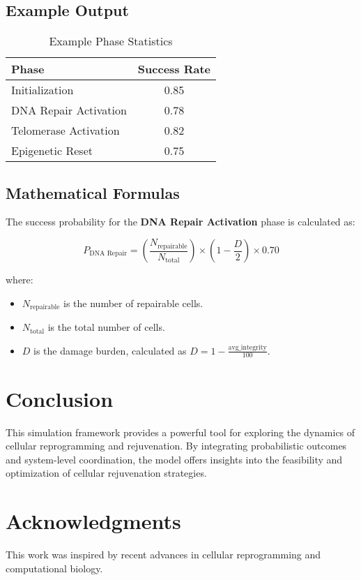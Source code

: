 \documentclass{article}
\begin{document}
\subsection{Example Output}
\begin{table}[h]
\centering
\caption{Example Phase Statistics}
\begin{tabular}{lc}
\toprule
\textbf{Phase} & \textbf{Success Rate} \\
\midrule
Initialization & 0.85 \\
DNA Repair Activation & 0.78 \\
Telomerase Activation & 0.82 \\
Epigenetic Reset & 0.75 \\
\bottomrule
\end{tabular}
\end{table}

\subsection{Mathematical Formulas}
The success probability for the \textbf{DNA Repair Activation} phase is calculated as:

\[
P_{\text{DNA Repair}} = \left( \frac{N_{\text{repairable}}}{N_{\text{total}}} \right) \times \left(1 - \frac{D}{2}\right) \times 0.70
\]

where:
\begin{itemize}
    \item \(N_{\text{repairable}}\) is the number of repairable cells.
    \item \(N_{\text{total}}\) is the total number of cells.
    \item \(D\) is the damage burden, calculated as \(D = 1 - \frac{\text{avg\_integrity}}{100}\).
\end{itemize}

\section{Conclusion}
This simulation framework provides a powerful tool for exploring the dynamics of cellular reprogramming and rejuvenation. By integrating probabilistic outcomes and system-level coordination, the model offers insights into the feasibility and optimization of cellular rejuvenation strategies.

\section*{Acknowledgments}
This work was inspired by recent advances in cellular reprogramming and computational biology.
\end{document}
